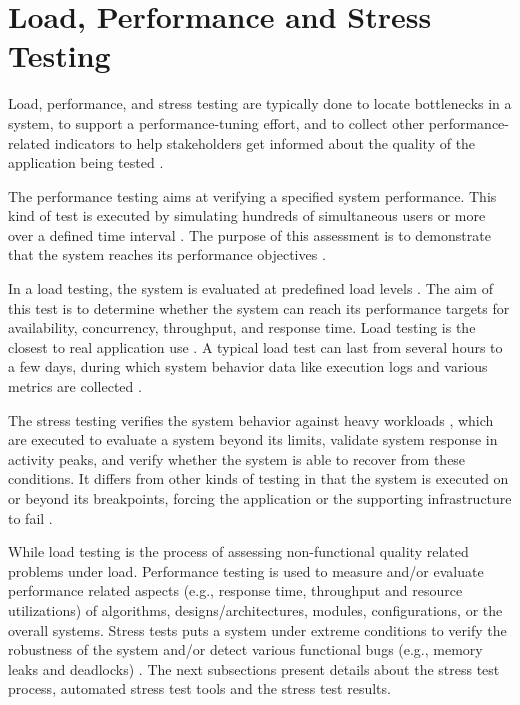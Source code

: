 \documentclass[times]{stvrauth}
\begin{document}
\section{Load, Performance and Stress Testing}

Load, performance, and stress testing are typically done to locate bottlenecks in a system, to support a performance-tuning effort, and to collect other performance-related indicators to help stakeholders get informed about the quality of the application being tested \cite{Sandler2004} \cite{Corporation2007}. 



The performance testing aims at verifying a specified system performance. This kind of test is executed by simulating hundreds of simultaneous users or more over a defined time interval \cite{DiLucca2006}. The purpose of this assessment is to demonstrate that the system reaches its performance objectives \cite{Sandler2004}. 


In a load testing, the system is evaluated at predefined load levels \cite{DiLucca2006}. The aim of this test is to determine whether the system can reach its performance targets for availability, concurrency, throughput, and response time. Load testing is the closest to real application use \cite{Molyneaux2009}. A typical load test can last from several hours to a few days, during which system behavior data like execution logs and various metrics are collected \cite{Afzal2009a}. 

The stress testing verifies the system behavior against heavy workloads \cite{Sandler2004}, which are executed to evaluate a system beyond its limits, validate system response in activity peaks, and verify whether the system is able to recover from these conditions. It differs from other kinds of testing in that the system is executed on or beyond its breakpoints, forcing the application or the supporting infrastructure to fail \cite{DiLucca2006} \cite{Molyneaux2009}.


While load testing is the process of assessing non-functional quality related problems under load. Performance testing is used to measure and/or evaluate performance
related aspects (e.g., response time, throughput and resource utilizations) of algorithms, designs/architectures, modules, configurations, or the overall systems. Stress tests puts a system under extreme conditions to verify the robustness of the system and/or detect various functional bugs (e.g., memory leaks and deadlocks) \cite{Afzal2009a}. The next subsections present details about the stress test process, automated stress test tools and the stress test results.
\end{document}
